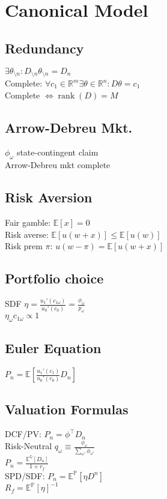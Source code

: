 \section{Canonical Model}
	\subsection*{Redundancy}
	$\exists\theta_{\setminus n}: D_{\setminus n}\theta_{\setminus n} = D_{n}$\\
	Complete: $\forall c_{1}\in\mathbb{R}^{m}\exists\theta\in\mathbb{R}^{n}: D\theta = c_{1}$\\
	Complete $\iff\operatorname{rank}\left(D\right) = M$
	
	\subsection*{Arrow-Debreu Mkt.}
	$\phi_{\omega}$ state-contingent claim\\
	Arrow-Debreu mkt complete

	\subsection*{Risk Aversion}
	Fair gamble: $\mathbb{E}\left[x\right] = 0$\\
	Risk averse: $\mathbb{E}\left[u\left(w + x\right)\right]\leq\mathbb{E}\left[u\left(w\right)\right]$\\
	Risk prem $\pi$: $u\left(w - \pi\right) = \mathbb{E}\left[u\left(w + x\right)\right]$
	
	\subsection*{Portfolio choice}
	SDF $\eta = \frac{u_{1}'\left(c_{1\omega}\right)}{u_{0}'\left(c_{0}\right)} = \frac{\phi_{\omega}}{p_{\omega}}$\\
	$\eta_{\omega}c_{1\omega}\propto 1$
	
	\subsection*{Euler Equation}
	$P_{n} = \mathbb{E}\left[\frac{u_{1}'\left(c_{1}\right)}{u_{0}'\left(c_{0}\right)}D_{n}\right]$
	
	\subsection*{Valuation Formulas}
	DCF/PV: $P_{n} = \phi^{\intercal}D_{n}$\\
	Risk-Neutral $q_{\omega}\equiv\frac{\phi_{\omega}}{\sum_{\omega'}\phi_{\omega'}}$\\
	$P_{n} = \frac{\mathbb{E}^{\mathbb{Q}}\left[D_{n}\right]}{1 + r_{f}}$\\
	SPD/SDF: $P_{n} = \mathbb{E}^{\mathbb{P}}\left[\eta D^{n}\right]$\\
	$R_{f} = \mathbb{E}^{\mathbb{P}}\left[\eta\right]^{-1}$
	
